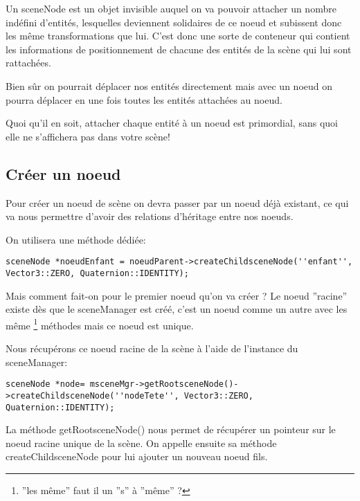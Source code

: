 Un sceneNode est un objet invisible auquel on va pouvoir attacher un nombre ind\'efini d'entit\'es, lesquelles deviennent solidaires de ce noeud et subissent donc les m\^eme transformations que lui. C'est donc une sorte de conteneur qui contient les informations de positionnement de chacune des entit\'es de la sc\`ene qui lui sont rattach\'ees.

Bien s\^ur on pourrait d\'eplacer nos entit\'es directement mais avec un noeud on pourra d\'eplacer en une fois toutes les entit\'es attach\'ees au noeud.

Quoi qu'il en soit, attacher chaque entit\'e \`{a} un noeud est primordial, sans quoi elle ne s'affichera pas dans votre sc\`ene!



\subsection{Cr\'eer un noeud}

Pour cr\'eer un noeud de sc\`ene on devra passer par un noeud d\'ej\`{a} existant, ce qui va nous permettre d'avoir des relations d'h\'eritage entre nos noeuds.\newline

On utilisera une m\'ethode d\'edi\'ee:

\begin{lstlisting}
sceneNode *noeudEnfant = noeudParent->createChildsceneNode(''enfant'', Vector3::ZERO, Quaternion::IDENTITY);
\end{lstlisting}


Mais comment fait-on pour le premier noeud qu'on va cr\'eer ? Le noeud ''racine'' existe d\`es que le sceneManager est cr\'e\'e, c'est un noeud comme un autre avec les m\^eme \footnote{''les m\^eme'' faut il un ''s'' \`{a} ''m\^eme'' ?} m\'ethodes mais ce noeud est unique.\newline

Nous r\'ecup\'erons ce noeud racine de la sc\`ene  \`{a} l'aide de l'instance du sceneManager:
\begin{lstlisting}
sceneNode *node= msceneMgr->getRootsceneNode()->createChildsceneNode(''nodeTete'', Vector3::ZERO, Quaternion::IDENTITY);
\end{lstlisting}

La m\'ethode getRootsceneNode() nous permet de r\'ecup\'erer un pointeur sur le noeud racine unique de la sc\`ene. On appelle ensuite sa m\'ethode createChildsceneNode pour lui ajouter un nouveau noeud fils.

